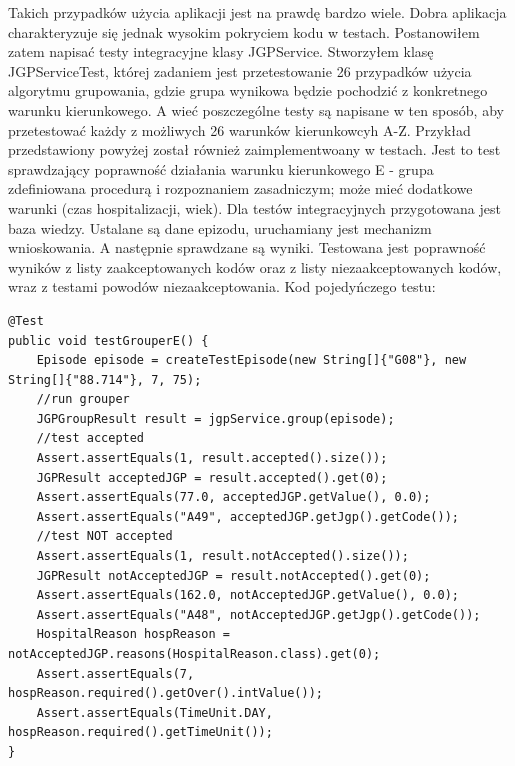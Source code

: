 Takich przypadków użycia aplikacji jest na prawdę bardzo wiele. Dobra aplikacja charakteryzuje się jednak wysokim pokryciem kodu w testach. Postanowiłem zatem napisać testy integracyjne klasy JGPService. Stworzyłem klasę JGPServiceTest, której zadaniem jest przetestowanie 26 przypadków użycia algorytmu grupowania, gdzie grupa wynikowa będzie pochodzić z konkretnego warunku kierunkowego. A wieć poszczególne testy są napisane w ten sposób, aby przetestować każdy z możliwych 26 warunków kierunkowcyh A-Z.
Przykład przedstawiony powyżej został również zaimplementwoany w testach. Jest to test sprawdzający poprawność działania warunku kierunkowego E - grupa zdefiniowana procedurą i rozpoznaniem zasadniczym; może mieć dodatkowe warunki (czas hospitalizacji, wiek).
Dla testów integracyjnych przygotowana jest baza wiedzy. Ustalane są dane epizodu, uruchamiany jest mechanizm wnioskowania. A następnie sprawdzane są wyniki. Testowana jest poprawność wyników z listy zaakceptowanych kodów oraz z listy niezaakceptowanych kodów, wraz z testami powodów niezaakceptowania.
Kod pojedyńczego testu:
\begin{verbatim}
@Test
public void testGrouperE() {
    Episode episode = createTestEpisode(new String[]{"G08"}, new String[]{"88.714"}, 7, 75);
    //run grouper
    JGPGroupResult result = jgpService.group(episode);
    //test accepted
    Assert.assertEquals(1, result.accepted().size());
    JGPResult acceptedJGP = result.accepted().get(0);
    Assert.assertEquals(77.0, acceptedJGP.getValue(), 0.0);
    Assert.assertEquals("A49", acceptedJGP.getJgp().getCode());
    //test NOT accepted
    Assert.assertEquals(1, result.notAccepted().size());
    JGPResult notAcceptedJGP = result.notAccepted().get(0);
    Assert.assertEquals(162.0, notAcceptedJGP.getValue(), 0.0);
    Assert.assertEquals("A48", notAcceptedJGP.getJgp().getCode());
    HospitalReason hospReason = notAcceptedJGP.reasons(HospitalReason.class).get(0);
    Assert.assertEquals(7, hospReason.required().getOver().intValue());
    Assert.assertEquals(TimeUnit.DAY, hospReason.required().getTimeUnit());
}
\end{verbatim}

